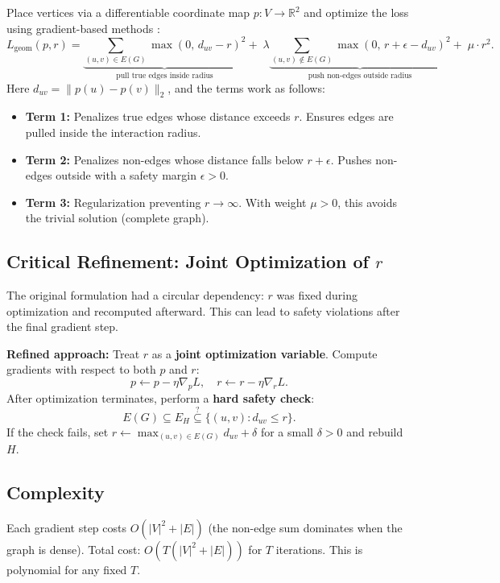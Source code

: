 \documentclass[11pt]{article}
\newcommand{\R}{\mathbb{R}}
\begin{document}
Place vertices via a differentiable coordinate map $p : V \to \R^2$ and
optimize the loss using gradient-based methods \cite{Nesterov2004, Boyd2004}:
\[
  L_{\mathrm{geom}}(p, r)
  =
  \underbrace{\sum_{(u,v)\in E(G)} \max(0,\, d_{uv} - r)^2}_{\text{pull true
  edges inside radius}}
  +\;
  \lambda
  \underbrace{\sum_{(u,v)\notin E(G)} \max(0,\, r + \epsilon -
  d_{uv})^2}_{\text{push non-edges outside radius}}
  +\;
  \mu \cdot r^2.
\]
Here $d_{uv} = \|p(u) - p(v)\|_2$, and the terms work as follows:
\begin{itemize}
  \item \textbf{Term 1:} Penalizes true edges whose distance exceeds $r$.  Ensures edges are pulled inside the interaction radius.
  \item \textbf{Term 2:} Penalizes non-edges whose distance falls below $r + \epsilon$. Pushes non-edges outside with a safety margin $\epsilon > 0$.
  \item \textbf{Term 3:} Regularization preventing $r \to \infty$.  With weight $\mu > 0$, this avoids the trivial solution (complete graph).
\end{itemize}

\subsection{Critical Refinement: Joint Optimization of $r$}

The original formulation had a circular dependency: $r$ was fixed during
optimization and recomputed afterward. This can lead to safety violations after
the final gradient step.

\textbf{Refined approach:} Treat $r$ as a \textbf{joint optimization variable}.
Compute gradients with respect to both $p$ and $r$:
\[
  p \leftarrow p - \eta \nabla_p L, \quad r \leftarrow r - \eta \nabla_r L.
\]
After optimization terminates, perform a \textbf{hard safety check}:
\[
  E(G) \subseteq E_H \stackrel{?}{\subseteq} \{(u,v) : d_{uv} \leq r\}.
\]
If the check fails, set $r \leftarrow \max_{(u,v)\in E(G)} d_{uv} + \delta$ for
a small $\delta > 0$ and rebuild $H$.

\subsection{Complexity}

Each gradient step costs $O(|V|^2 + |E|)$ (the non-edge sum dominates when
the graph is dense). Total cost: $O\!\left(T(|V|^2 + |E|)\right)$ for $T$
iterations. This is polynomial for any fixed $T$.
\end{document}
